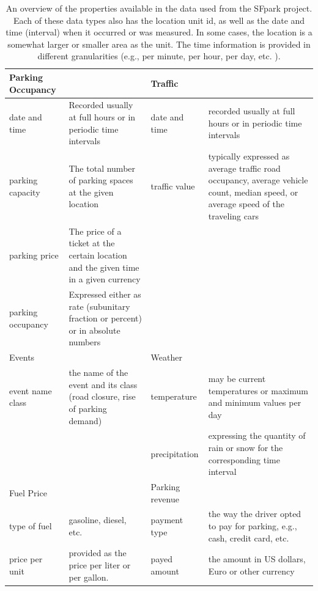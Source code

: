\begin{table}
\begin{tabular}{lp{6cm}lp{6cm}}	
	\toprule
Parking Occupancy & & Traffic & \\
\midrule
date and time & Recorded usually at full hours or in periodic time intervals & date and time & recorded usually at full hours or in periodic time intervals \\
parking capacity & The total number of parking spaces at the given location & traffic value & typically expressed as average traffic road occupancy, average vehicle count, median speed, or average speed of the traveling cars \\
parking price & The price of a ticket at the certain location and the given time in a given currency & & \\
parking occupancy & Expressed either as rate (subunitary fraction or percent) or in absolute numbers & & \\
	\midrule
	Events & & Weather & \\
	\midrule
	event name class & the name of the event and its class (road closure, rise of parking demand) & temperature & may be current temperatures or maximum and minimum values per day \\
	 & & 	precipitation & expressing the quantity of rain or snow for the corresponding time interval \\
	\midrule
Fuel Price & & Parking revenue & \\
\midrule	 
	 type of fuel & gasoline, diesel, etc. & payment type & the way the driver opted to pay for parking, e.g., cash, credit card, etc. \\
	 
	 price per unit & provided as the price per liter or per gallon. & payed amount & the amount in US dollars, Euro or other currency\\
	 
	\bottomrule
\end{tabular}

	\caption{An overview of the properties available in the data used from the SFpark project. 
		Each of these data types also has the location unit id, as well as the date and time (interval) when it occurred or was measured. 
		In some cases, the location is a somewhat larger or smaller area as the unit. The time information is provided in different granularities (e.g., per minute, per hour, per day, etc. ).}
	\label{tab:sfpark_data}
\end{table}

